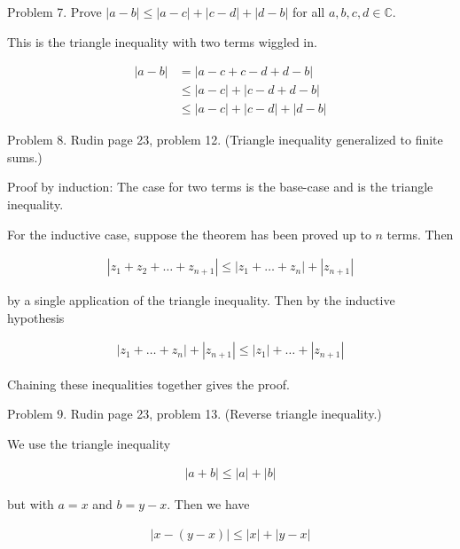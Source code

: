 \documentclass{article}
\begin{document}
\pagebreak

{\Large \color{Sepia} Problem 7. Prove $|a-b| \leq |a-c|+|c-d|+|d-b|$ for all $a,b,c,d\in\mathbb C$.}

\vspace{1cm}

This is the triangle inequality with two terms wiggled in.

\begin{align*}
 |a-b| &= |a-c+c-d+d-b| \\
 &\leq |a-c|+|c-d+d-b| \\
 &\leq |a-c|+|c-d|+|d-b|
\end{align*}

\pagebreak

{\Large \color{Sepia} Problem 8. Rudin page 23, problem 12.  (Triangle inequality generalized to finite sums.)}

\vspace{1cm}

Proof by induction:  The case for two terms is the base-case and is the triangle inequality.

For the inductive case, suppose the theorem has been proved up to $n$ terms.  Then

\begin{align*}
    |z_1+z_2+\dots +z_{n+1}| \leq |z_1+\dots +z_n|+|z_{n+1}|
\end{align*}

by a single application of the triangle inequality.  Then by the inductive hypothesis

\begin{align*}
    |z_1+\dots +z_n|+|z_{n+1}| \leq |z_1|+\dots +|z_{n+1}|
\end{align*}

Chaining these inequalities together gives the proof.

\pagebreak

{\Large \color{Sepia} Problem 9. Rudin page 23, problem 13.  (Reverse triangle inequality.)}

\vspace{1cm}

We use the triangle inequality

\begin{align*}
    |a+b| \leq |a|+|b|
\end{align*}

but with $a=x$ and $b=y-x$.  Then we have

\begin{align*}
    |x - (y-x)| \leq |x|+|y-x|
\end{align*}
\end{document}
